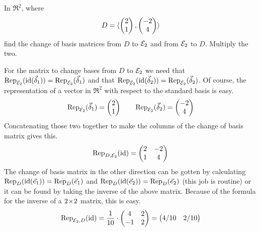 \begin{exercises}
  \recommended \item 
    In \( \Re^2 \), where
    \begin{equation*}
      D=\sequence{\colvec{2 \\ 1},\colvec{-2 \\ 4}}
    \end{equation*}
    find the change of basis matrices from \( D \) to \( \stdbasis_2 \) and 
    from \( \stdbasis_2 \) to \( D \).
    Multiply the two.
    \begin{answer}
      For the matrix to change bases from $D$ to $\stdbasis_2$ we need that
      $\rep{\identity(\vec{\delta}_1)}{\stdbasis_2}
        =\rep{\vec{\delta}_1}{\stdbasis_2}$ 
      and that 
      $\rep{\identity(\vec{\delta}_2)}{\stdbasis_2}
        =\rep{\vec{\delta}_2}{\stdbasis_2}$.
      Of course, the representation of a vector in $\Re^2$ with respect to 
      the standard basis is easy.
      \begin{equation*}
        \rep{\vec{\delta}_1}{\stdbasis_2}=\colvec{2 \\ 1}
        \qquad
        \rep{\vec{\delta}_2}{\stdbasis_2}=\colvec{-2 \\ 4}
      \end{equation*}
      Concatenating those two together to make the columns of the change of
      basis matrix gives this. 
      \begin{equation*}
        \rep{\identity}{D,\stdbasis_2}
        =\begin{pmatrix}
          2     &-2    \\
          1     &4
        \end{pmatrix}
      \end{equation*}
      The change of basis matrix in the other direction can be gotten by
      calculating $\rep{\identity(\vec{e}_1)}{D}=\rep{\vec{e}_1}{D}$ and 
      $\rep{\identity(\vec{e}_2)}{D}=\rep{\vec{e}_2}{D}$ (this job is routine)
      or it can be found by taking the inverse of the above matrix.
      Because of the formula for the inverse of a $\nbyn{2}$ matrix, 
      this is easy. 
      \begin{equation*}
        \rep{\identity}{\stdbasis_2,D}=
        \frac{1}{10}\cdot\begin{pmatrix}
          4  &2  \\
         -1  &2
        \end{pmatrix}
        =\begin{pmatrix}
          4/10  &2/10  \\

\end{pmatrix}
\end{equation*}
\end{answer}
\end{exercises}
